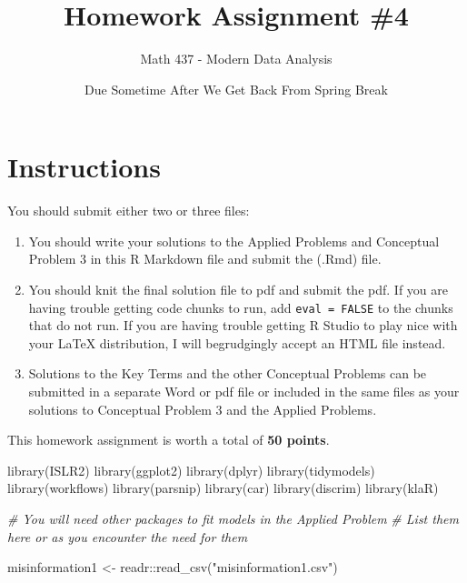 \documentclass[
]{article}
\title{Homework Assignment \#4}
\author{Math 437 - Modern Data Analysis}
\date{Due Sometime After We Get Back From Spring Break}
\newenvironment{Shaded}{\begin{snugshade}}{\end{snugshade}}
\newcommand{\CommentTok}[1]{\textcolor[rgb]{0.56,0.35,0.01}{\textit{#1}}}
\newcommand{\FunctionTok}[1]{\textcolor[rgb]{0.00,0.00,0.00}{#1}}
\newcommand{\NormalTok}[1]{#1}
\newcommand{\OtherTok}[1]{\textcolor[rgb]{0.56,0.35,0.01}{#1}}
\newcommand{\SpecialCharTok}[1]{\textcolor[rgb]{0.00,0.00,0.00}{#1}}
\newcommand{\StringTok}[1]{\textcolor[rgb]{0.31,0.60,0.02}{#1}}
\providecommand{\tightlist}{%
  \setlength{\itemsep}{0pt}\setlength{\parskip}{0pt}}
\begin{document}
\maketitle

\hypertarget{instructions}{%
\section{Instructions}\label{instructions}}

You should submit either two or three files:

\begin{enumerate}
\def\labelenumi{\arabic{enumi}.}
\tightlist
\item
  You should write your solutions to the Applied Problems and Conceptual
  Problem 3 in this R Markdown file and submit the (.Rmd) file.
\item
  You should knit the final solution file to pdf and submit the pdf. If
  you are having trouble getting code chunks to run, add
  \texttt{eval\ =\ FALSE} to the chunks that do not run. If you are
  having trouble getting R Studio to play nice with your LaTeX
  distribution, I will begrudgingly accept an HTML file instead.
\item
  Solutions to the Key Terms and the other Conceptual Problems can be
  submitted in a separate Word or pdf file or included in the same files
  as your solutions to Conceptual Problem 3 and the Applied Problems.
\end{enumerate}

This homework assignment is worth a total of \textbf{50 points}.

\begin{Shaded}
\begin{Highlighting}[]
\FunctionTok{library}\NormalTok{(ISLR2)}
\FunctionTok{library}\NormalTok{(ggplot2)}
\FunctionTok{library}\NormalTok{(dplyr)}
\FunctionTok{library}\NormalTok{(tidymodels)}
\FunctionTok{library}\NormalTok{(workflows) }
\FunctionTok{library}\NormalTok{(parsnip) }
\FunctionTok{library}\NormalTok{(car)}
\FunctionTok{library}\NormalTok{(discrim)}
\FunctionTok{library}\NormalTok{(klaR)}

\CommentTok{\# You will need other packages to fit models in the Applied Problem}
\CommentTok{\# List them here or as you encounter the need for them}

\NormalTok{misinformation1 }\OtherTok{\textless{}{-}}\NormalTok{ readr}\SpecialCharTok{::}\FunctionTok{read\_csv}\NormalTok{(}\StringTok{"misinformation1.csv"}\NormalTok{)}
\end{Highlighting}
\end{Shaded}
\end{document}
